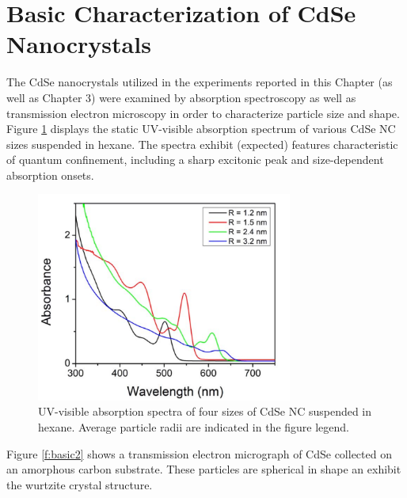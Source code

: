 \section{Basic Characterization of CdSe Nanocrystals}
The CdSe nanocrystals utilized in the experiments reported in this Chapter (as well as Chapter 3) were examined by absorption spectroscopy as well as transmission electron microscopy in order to characterize particle size and shape. Figure \ref{f:basic1} displays the static UV-visible absorption spectrum of various CdSe NC sizes suspended in hexane. The spectra exhibit (expected) features characteristic of quantum confinement, including a sharp excitonic peak and size-dependent absorption onsets. 

\begin{figure}
\begin{center}
\includegraphics[width=0.75\textwidth]{./Chapter2/basic1.png}
\caption[Absorption spectra of CdSe NC samples examined in this work.]{UV-visible absorption spectra of four sizes of CdSe NC suspended in hexane.  Average particle radii are indicated in the figure legend.}
\label{f:basic1}
\end{center}
\end{figure}

Figure \ref{f:basic2} shows a transmission electron micrograph of CdSe collected on an amorphous carbon substrate. These particles are spherical in shape an exhibit the wurtzite crystal structure.

